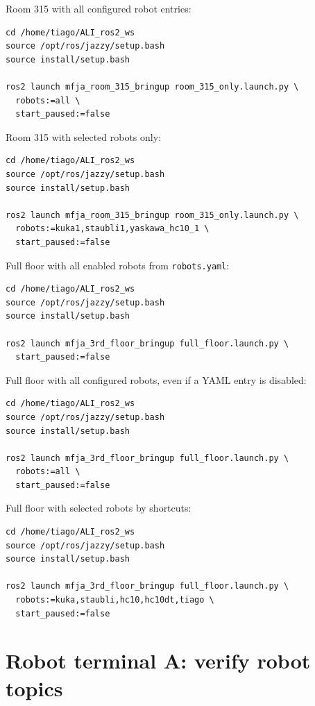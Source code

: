\documentclass[12pt,a4paper]{report}
\begin{document}
Room 315 with all configured robot entries:

\begin{lstlisting}[style=terminalcode]
cd /home/tiago/ALI_ros2_ws
source /opt/ros/jazzy/setup.bash
source install/setup.bash

ros2 launch mfja_room_315_bringup room_315_only.launch.py \
  robots:=all \
  start_paused:=false
\end{lstlisting}

Room 315 with selected robots only:

\begin{lstlisting}[style=terminalcode]
cd /home/tiago/ALI_ros2_ws
source /opt/ros/jazzy/setup.bash
source install/setup.bash

ros2 launch mfja_room_315_bringup room_315_only.launch.py \
  robots:=kuka1,staubli1,yaskawa_hc10_1 \
  start_paused:=false
\end{lstlisting}

Full floor with all enabled robots from \texttt{robots.yaml}:

\begin{lstlisting}[style=terminalcode]
cd /home/tiago/ALI_ros2_ws
source /opt/ros/jazzy/setup.bash
source install/setup.bash

ros2 launch mfja_3rd_floor_bringup full_floor.launch.py \
  start_paused:=false
\end{lstlisting}

Full floor with all configured robots, even if a YAML entry is disabled:

\begin{lstlisting}[style=terminalcode]
cd /home/tiago/ALI_ros2_ws
source /opt/ros/jazzy/setup.bash
source install/setup.bash

ros2 launch mfja_3rd_floor_bringup full_floor.launch.py \
  robots:=all \
  start_paused:=false
\end{lstlisting}

Full floor with selected robots by shortcuts:

\begin{lstlisting}[style=terminalcode]
cd /home/tiago/ALI_ros2_ws
source /opt/ros/jazzy/setup.bash
source install/setup.bash

ros2 launch mfja_3rd_floor_bringup full_floor.launch.py \
  robots:=kuka,staubli,hc10,hc10dt,tiago \
  start_paused:=false
\end{lstlisting}

\section{Robot terminal A: verify robot topics}
\end{document}

